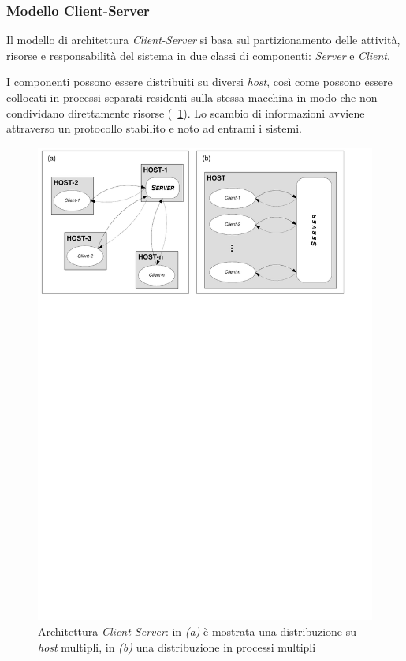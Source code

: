 \subsubsection{Modello Client-Server}
Il modello di architettura \emph{Client-Server} si basa sul partizionamento delle attività, risorse e responsabilità del sistema in due classi di componenti: \emph{Server} e \emph{Client}.

I componenti possono essere distribuiti su diversi \emph{host}, così come possono essere collocati in processi separati residenti sulla stessa macchina in modo che non condividano direttamente risorse (\figurename~\ref{fig:client-server}). Lo scambio di informazioni avviene attraverso un protocollo stabilito e noto ad entrami i sistemi.

\begin{figure}[h]
\centering
\includegraphics[scale=0.7, viewport=6 582 546 838]{Immagini/Capitolo2/Client-Server.pdf}
\caption[Architettura \emph{Client-Server}]{Architettura \emph{Client-Server}: in \emph{(a)} è mostrata una distribuzione su \emph{host} multipli, in \emph{(b)} una distribuzione in processi multipli}\label{fig:client-server}
\end{figure}

